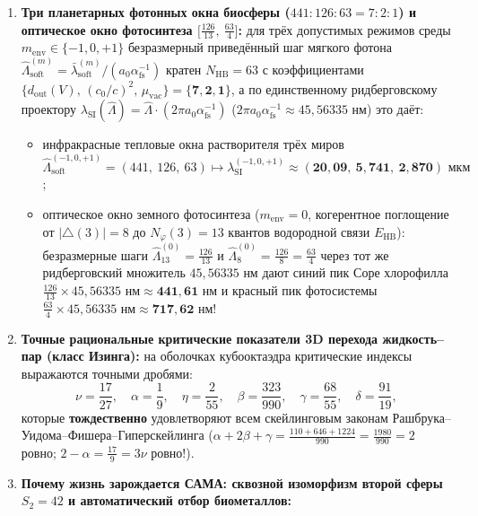 \begin{enumerate}[label=\textbf{\arabic*.},noitemsep]
\item \textbf{Три планетарных фотонных окна биосферы ($441 : 126 : 63 = 7 : 2 : 1$) и оптическое окно фотосинтеза $\bigl[\frac{126}{13},\ \frac{63}{4}\bigr]$:}
  для трёх допустимых режимов среды $m_{\mathrm{env}}\in\{-1, 0, +1\}$ безразмерный приведённый шаг мягкого фотона $\widehat{\Lambda}_{\mathrm{soft}}^{(m)} = \bar{\lambda}_{\mathrm{soft}}^{(m)}/(a_0\alpha_{\mathrm{fs}}^{-1})$ кратен $N_{\mathrm{HB}} = 63$ с коэффициентами $\{d_{\mathrm{out}}(V),\,(c_0/c)^2,\,\mu_{\mathrm{vac}}\} = \{\mathbf{7, 2, 1}\}$, а по единственному ридберговскому проектору $\lambda_{\mathrm{SI}}(\widehat{\Lambda}) = \widehat{\Lambda}\cdot(2\pi a_0\alpha_{\mathrm{fs}}^{-1})$ ($2\pi a_0\alpha_{\mathrm{fs}}^{-1} \approx 45{,}56335\text{ нм}$) это даёт:
  \begin{itemize}[noitemsep]
  \item инфракрасные тепловые окна растворителя трёх миров $\widehat{\Lambda}_{\mathrm{soft}}^{(-1,0,+1)} = (441,\ 126,\ 63) \longmapsto \lambda_{\mathrm{SI}}^{(-1,0,+1)} \approx \mathbf{(20{,}09,\ 5{,}741,\ 2{,}870)\text{ мкм}}$;
  \item оптическое окно земного фотосинтеза ($m_{\mathrm{env}} = 0$, когерентное поглощение от $|{\triangle}(3)| = 8$ до $N_\varphi(3) = 13$ квантов водородной связи $E_{\mathrm{HB}}$): безразмерные шаги $\widehat{\Lambda}_{13}^{(0)} = \frac{126}{13}$ и $\widehat{\Lambda}_8^{(0)} = \frac{126}{8} = \frac{63}{4}$ через тот же ридберговский множитель $45{,}56335\text{ нм}$ дают синий пик Соре хлорофилла $\frac{126}{13}\times 45{,}56335\text{ нм} \approx \mathbf{441{,}61\text{ нм}}$ и красный пик фотосистемы $\frac{63}{4}\times 45{,}56335\text{ нм} \approx \mathbf{717{,}62\text{ нм}}$!
  \end{itemize}
\item \textbf{Точные рациональные критические показатели 3D перехода жидкость--пар (класс Изинга):}
  на оболочках кубооктаэдра критические индексы выражаются точными дробями:
  \[
    \nu = \frac{17}{27},\quad \alpha = \frac{1}{9},\quad \eta = \frac{2}{55},\quad \beta = \frac{323}{990},\quad \gamma = \frac{68}{55},\quad \delta = \frac{91}{19},
  \]
  которые \textbf{тождественно} удовлетворяют всем скейлинговым законам Рашбрука--Уидома--Фишера--Гиперскейлинга ($\alpha + 2\beta + \gamma = \frac{110 + 646 + 1224}{990} = \frac{1980}{990} = 2$ ровно; $2 - \alpha = \frac{17}{9} = 3\nu$ ровно!).
\item \textbf{Почему жизнь зарождается САМА: сквозной изоморфизм второй сферы $S_2 = 42$ и автоматический отбор биометаллов:}

\end{enumerate}
